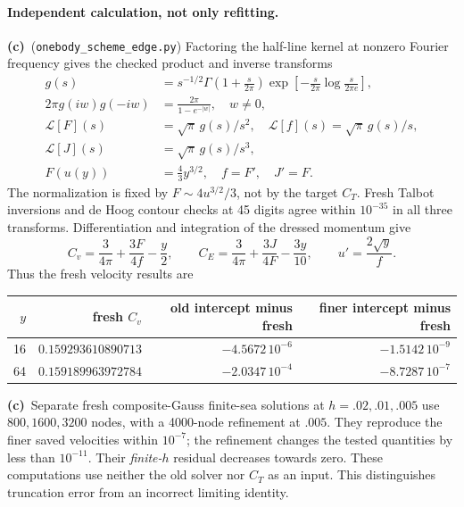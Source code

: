 \documentclass[11pt,a4paper]{article}
\newcommand{\Lc}{\textbf{(c)}\ }
\newcommand{\echeck}{\texttt{onebody\_\allowbreak scheme\_\allowbreak edge.py}}
\begin{document}
\paragraph{Independent calculation, not only refitting.}
\Lc (\echeck) Factoring the half-line kernel at nonzero Fourier frequency
gives the checked product and inverse transforms
\begin{align}
 g(s)&=s^{-1/2}\Gamma\!\left(1+\frac{s}{2\pi}\right)
       \exp\!\left[-\frac{s}{2\pi}\log\frac{s}{2\pi e}\right],\\
 2\pi g(iw)g(-iw)&=\frac{2\pi}{1-e^{-|w|}},\quad w\ne0,\\
 \mathcal L[F](s)&=\sqrt\pi\,g(s)/s^2,\quad
 \mathcal L[f](s)=\sqrt\pi\,g(s)/s,\label{eq:transforms}\\
 \mathcal L[J](s)&=\sqrt\pi\,g(s)/s^3,\\
 F(u(y))&=\frac43y^{3/2},\quad f=F',\quad J'=F.
\end{align}
The normalization is fixed by $F\sim4u^{3/2}/3$, not by the target
$C_T$. Fresh Talbot inversions and de Hoog contour checks at 45 digits
agree within $10^{-35}$ in all three transforms. Differentiation and
integration of the dressed momentum give
\begin{equation}\label{eq:edgeobservables}
 C_v=\frac3{4\pi}+\frac{3F}{4f}-\frac y2,
 \qquad C_E=\frac3{4\pi}+\frac{3J}{4F}-\frac{3y}{10},
 \qquad u'=\frac{2\sqrt y}{f}.
\end{equation}
Thus the fresh velocity results are
\begin{center}\small
\begin{tabular}{rrrr}\toprule
$y$ & fresh $C_v$ & old intercept minus fresh & finer intercept minus fresh\\\midrule
16 & $0.159293610890713$ & $-4.5672\,10^{-6}$ & $-1.5142\,10^{-9}$\\
64 & $0.159189963972784$ & $-2.0347\,10^{-4}$ & $-8.7287\,10^{-7}$\\\bottomrule
\end{tabular}
\end{center}
\Lc Separate fresh composite-Gauss finite-sea solutions at
$h=.02,.01,.005$ use $800,1600,3200$ nodes, with a 4000-node
refinement at $.005$. They reproduce the finer saved
velocities within $10^{-7}$; the refinement changes the tested quantities
by less than $10^{-11}$. Their \emph{finite-$h$} residual decreases
towards zero. These computations use neither the old solver nor $C_T$ as
an input. This distinguishes truncation error from an incorrect limiting
identity.
\end{document}
